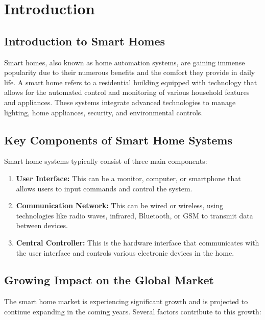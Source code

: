 \section{Introduction}\label{sec:introduction}


\subsection*{Introduction to Smart Homes}

Smart homes, also known as home automation systems, are gaining immense popularity due to their numerous benefits and the comfort they provide in daily life. A smart home refers to a residential building equipped with technology that allows for the automated control and monitoring of various household features and appliances. These systems integrate advanced technologies to manage lighting, home appliances, security, and environmental controls.

\subsection*{Key Components of Smart Home Systems}

Smart home systems typically consist of three main components:

\begin{enumerate}
	\item \textbf{User Interface:} This can be a monitor, computer, or smartphone that allows users to input commands and control the system.
	\item \textbf{Communication Network:} This can be wired or wireless, using technologies like radio waves, infrared, Bluetooth, or GSM to transmit data between devices.
	\item \textbf{Central Controller:} This is the hardware interface that communicates with the user interface and controls various electronic devices in the home.
\end{enumerate}

\subsection*{Growing Impact on the Global Market}

The smart home market is experiencing significant growth and is projected to continue expanding in the coming years. Several factors contribute to this growth:


